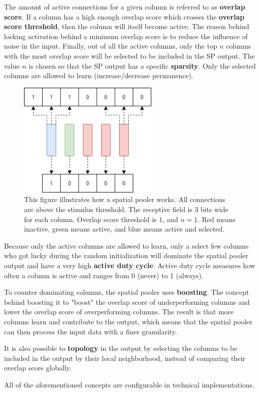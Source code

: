 The amount of active connections for a given column is referred to as \textbf{overlap score}. If a column has a high enough overlap score which crosses the \textbf{overlap score threshold}, then the column will itself become active. The reason behind locking activation behind a minimum overlap score is to reduce the influence of noise in the input. Finally, out of all the active columns, only the top $n$ columns with the most overlap score will be selected to be included in the SP output. The value $n$ is chosen so that the SP output has a specific \textbf{sparsity}. Only the selected columns are allowed to learn (increase/decrease permanence).\par
\begin{figure}[H]
    \centering
    \includegraphics[width=0.6\textwidth]{resources/related_works/sp_vis.png}
    \caption{ This figure illustrates how a spatial pooler works. All connections are above the stimulus threshold. The receptive field is 3 bits wide for each column. Overlap score threshold is $1$, and $n=1$. Red means inactive, green means active, and blue means active and selected.}
    \label{fig:sp_vis}
\end{figure}
Because only the active columns are allowed to learn, only a select few columns who got lucky during the random initialization will dominate the spatial pooler output and have a very high \textbf{active duty cycle}. Active duty cycle measures how often a column is active and ranges from 0 (never) to 1 (always). \par
To counter dominating columns, the spatial pooler uses \textbf{boosting}.
The concept behind boosting it to "boost" the overlap score of underperforming columns and lower the overlap score of overperforming columns. The result is that more columns learn and contribute to the output, which means that the spatial pooler can then process the input data with a finer granularity.
\par
It is also possible to \textbf{topology} in the output by selecting the columns to be included in the output by their local neighborhood, instead of comparing their overlap score globally.
\par
All of the aforementioned concepts are configurable in technical implementations.

